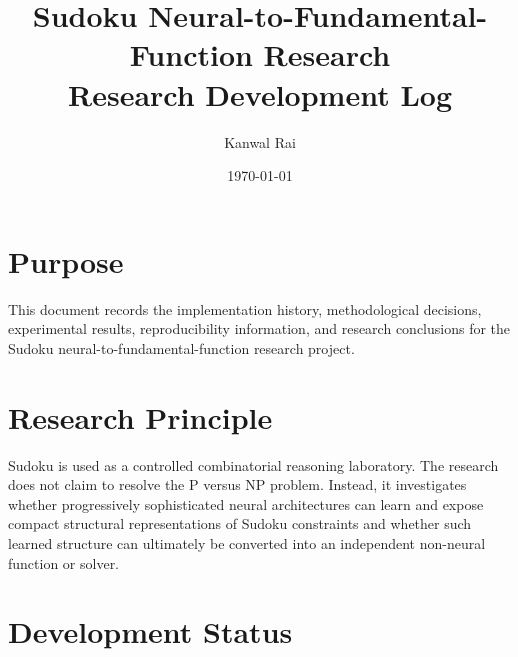 \documentclass[11pt,a4paper]{article}
\title{Sudoku Neural-to-Fundamental-Function Research\\
Research Development Log}
\author{Kanwal Rai}
\date{\today}
\begin{document}
\maketitle

\section{Purpose}

This document records the implementation history, methodological decisions,
experimental results, reproducibility information, and research conclusions
for the Sudoku neural-to-fundamental-function research project.

\section{Research Principle}

Sudoku is used as a controlled combinatorial reasoning laboratory. The
research does not claim to resolve the P versus NP problem. Instead, it
investigates whether progressively sophisticated neural architectures can
learn and expose compact structural representations of Sudoku constraints
and whether such learned structure can ultimately be converted into an
independent non-neural function or solver.

\section{Development Status}
\end{document}
